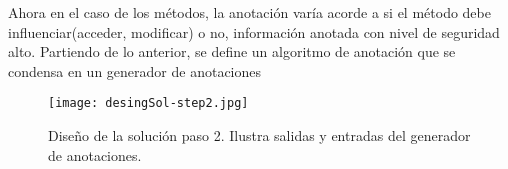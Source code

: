 Ahora en el caso de los métodos, la anotación varía acorde a si el método debe
influenciar(acceder, modificar) o no, información anotada con nivel de seguridad
alto.
Partiendo de lo anterior, se define un algoritmo de anotación que se condensa en
un generador de anotaciones\newline
\begin{figure}[h!]
	\begin{center}
	\texttt{[image: desingSol-step2.jpg]}
	\end{center}
	\caption{Diseño de la solución paso 2. Ilustra salidas y entradas del
	generador de anotaciones.}
	\label{fig:desingSol-step1}
\end{figure}




